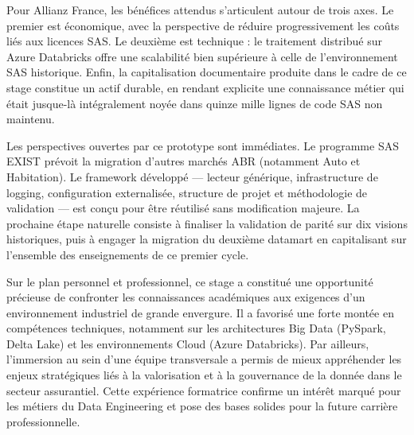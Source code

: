 Pour Allianz France, les bénéfices attendus s’articulent autour de trois axes. Le premier est économique, avec la perspective de réduire progressivement les coûts liés aux licences SAS. Le deuxième est technique : le traitement distribué sur Azure Databricks offre une scalabilité bien supérieure à celle de l’environnement SAS historique. Enfin, la capitalisation documentaire produite dans le cadre de ce stage constitue un actif durable, en rendant explicite une connaissance métier qui était jusque-là intégralement noyée dans quinze mille lignes de code SAS non maintenu.

Les perspectives ouvertes par ce prototype sont immédiates. Le programme SAS EXIST prévoit la migration d'autres marchés ABR (notamment Auto et Habitation). Le framework développé — lecteur générique, infrastructure de logging, configuration externalisée, structure de projet et méthodologie de validation — est conçu pour être réutilisé sans modification majeure. La prochaine étape naturelle consiste à finaliser la validation de parité sur dix visions historiques, puis à engager la migration du deuxième datamart en capitalisant sur l’ensemble des enseignements de ce premier cycle.

Sur le plan personnel et professionnel, ce stage a constitué une opportunité précieuse de confronter les connaissances académiques aux exigences d'un environnement industriel de grande envergure. Il a favorisé une forte montée en compétences techniques, notamment sur les architectures Big Data (PySpark, Delta Lake) et les environnements Cloud (Azure Databricks). Par ailleurs, l'immersion au sein d'une équipe transversale a permis de mieux appréhender les enjeux stratégiques liés à la valorisation et à la gouvernance de la donnée dans le secteur assurantiel. Cette expérience formatrice confirme un intérêt marqué pour les métiers du Data Engineering et pose des bases solides pour la future carrière professionnelle.